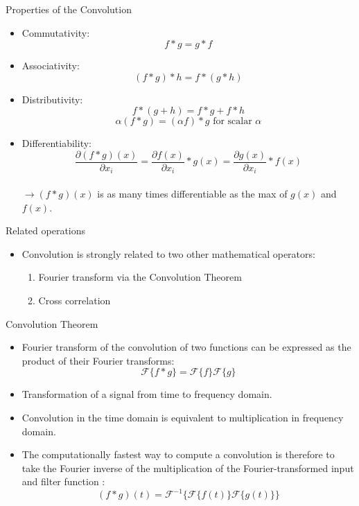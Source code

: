 \documentclass[11pt,compress,t,notes=noshow, xcolor=table]{beamer}
\begin{document}
\begin{vbframe}{Properties of the Convolution}
    \begin{itemize}
        \item Commutativity:
        $$ f \ast g = g \ast f$$
        \item Associativity:
        $$ (f \ast g) \ast h = f \ast (g \ast h)$$
        \item Distributivity:
        $$ f \ast (g + h) = f\ast g + f \ast h$$ 
        $$ \alpha (f \ast g) = (\alpha f) \ast g \text{ for scalar } \alpha$$ 
        \item Differentiability:
        $$ \frac{\partial (f\ast g)(x)}{\partial x_i} = \frac{\partial f(x)}{\partial x_i}\ast g(x) = \frac{\partial g(x)}{\partial x_i} \ast f(x)$$ \\
        $ \rightarrow (f\ast g)(x)$ is as many times differentiable as the max of $g(x)$ and $f(x)$.
    \end{itemize}
\end{vbframe}

\begin{vbframe}{Related operations}
    \begin{itemize}
        \item Convolution is strongly related to two other mathematical operators:
        \begin{enumerate}
            \item Fourier transform via the Convolution Theorem
            \item Cross correlation
        \end{enumerate}
    \end{itemize}
\end{vbframe}

\begin{vbframe}{Convolution Theorem}
    \begin{itemize}
        \item  Fourier transform of the convolution of two functions can be expressed as the product of their Fourier transforms:
        $$ 
            \mathcal{F} \{ f\ast g\} = \mathcal{F} \{f\}\mathcal{F} \{g\}
        $$
        \item Transformation of a signal from time to frequency domain.
        \item Convolution in the time domain is equivalent to multiplication in frequency domain.
        \item The computationally fastest way to compute a convolution is therefore to take the Fourier inverse of the multiplication of the Fourier-transformed input and filter function :
        $$
            (f \ast g)(t) = \mathcal{F}^{-1}\{\mathcal{F} \{f(t)\} \mathcal{F} \{g(t)\}\}
        $$
    \end{itemize}
\end{vbframe}
\end{document}
